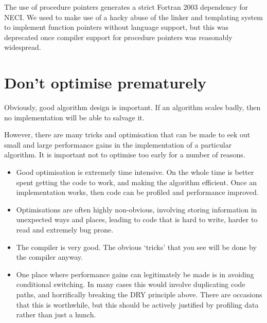 \documentclass[a4paper,notitlepage]{scrreprt}
\newcommand\headitem[1]{\needspace{1.5\baselineskip}\item[{\boldmath #1 \nopagebreak}] \hfill \\ \nopagebreak}
\begin{document}
		The use of procedure pointers generates a strict Fortran 2003
		dependency for NECI. We used to make use of a hacky abuse of the
		linker and templating system to implement function pointers without
		language support, but this was deprecated once compiler support
		for procedure pointers was reasonably widespread.

%
%

\section{Don't optimise prematurely}
	Obviously, good algorithm design is important. If an algorithm scales
	badly, then no implementation will be able to salvage it.

	However, there are many tricks and optimisation that can be made to
	eek out small and large performance gains in the implementation of a
	particular algorithm. It is important not to optimise too early for a
	number of reasons.
	\begin{itemize}
		\item
			Good optimisation is extremely time intensive. On the whole time
			is better spent getting the code to work, and making the
			algorithm efficient. Once an implementation works, then code can
			be profiled and performance improved.
		\item
			Optimisations are often highly non-obvious, involving storing
			information in unexpected ways and places, leading to code that
			is hard to write, harder to read and extremely bug prone.
		\item
			The compiler is very good. The obvious `tricks' that you see will
			be done by the compiler anyway.
		\item
			One place where performance gains can legitimately be made is in
			avoiding conditional switching. In many cases this would involve
			duplicating code paths, and horrifically breaking the DRY
			principle above. There are occasions that this is worthwhile, but
			this should be actively justified by profiling data rather than
			just a hunch.
	\end{itemize}
\end{document}
